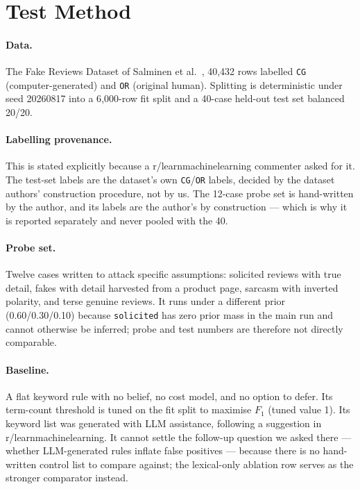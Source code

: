\documentclass{article}
\begin{document}
\section{Test Method}

\paragraph{Data.} The Fake Reviews Dataset of Salminen et
al.~, 40{,}432 rows labelled \texttt{CG}
(computer-generated) and \texttt{OR} (original human). Splitting is
deterministic under seed 20260817 into a 6{,}000-row fit split and a 40-case
held-out test set balanced 20/20.

\paragraph{Labelling provenance.} This is stated explicitly because a
r/learnmachinelearning commenter asked for it. The test-set labels are the
dataset's own \texttt{CG}/\texttt{OR} labels, decided by the dataset authors'
construction procedure, not by us. The 12-case probe set is hand-written by the
author, and its labels are the author's by construction --- which is why it is
reported separately and never pooled with the 40.

\paragraph{Probe set.} Twelve cases written to attack specific assumptions:
solicited reviews with true detail, fakes with detail harvested from a product
page, sarcasm with inverted polarity, and terse genuine reviews. It runs under
a different prior (0.60/0.30/0.10) because \texttt{solicited} has zero prior
mass in the main run and cannot otherwise be inferred; probe and test numbers
are therefore not directly comparable.

\paragraph{Baseline.} A flat keyword rule with no belief, no cost model, and no
option to defer. Its term-count threshold is tuned on the fit split to maximise
$F_1$ (tuned value 1). Its keyword list was generated with LLM
assistance, following a suggestion in r/learnmachinelearning. It cannot settle
the follow-up question we asked there --- whether LLM-generated rules inflate
false positives --- because there is no hand-written control list to compare
against; the lexical-only ablation row serves as the stronger comparator
instead.
\end{document}
